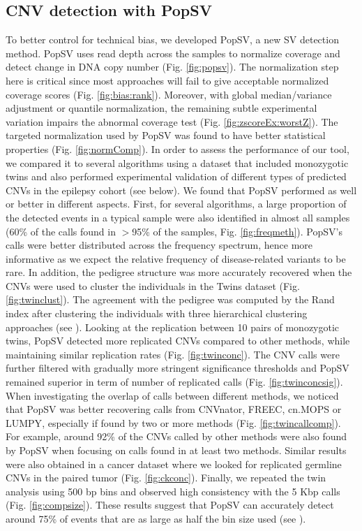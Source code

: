 \subsection*{CNV detection with {\sf PopSV}}
To better control for technical bias, we developed {\sf PopSV}, a new SV detection method.
{\sf PopSV} uses read depth across the samples to normalize coverage and detect change in DNA copy number (Fig. \ref{fig:popsv}).
The normalization step here is critical since most approaches will fail to give acceptable normalized coverage scores (Fig. \ref{fig:bias:rank}).
Moreover, with global median/variance adjustment or quantile normalization, the remaining subtle experimental variation impairs the abnormal coverage test (Fig. \ref{fig:zscoreEx:worstZ}).
The targeted normalization used by {\sf PopSV} was found to have better statistical properties (Fig. \ref{fig:normComp}).
In order to assess the performance of our tool, we compared it to several algorithms\cite{Boeva2011,Abyzov2011,Klambauer2012,Layer2012} using a dataset that included monozygotic twins and also performed experimental validation of different types of predicted CNVs in the epilepsy cohort (see below).
We found that {\sf PopSV} performed as well or better in different aspects.
First, for several algorithms, a large proportion of the detected events in a typical sample were also identified in almost all samples (60\% of the calls found in $>$95\% of the samples, Fig. \ref{fig:freqmeth}).
{\sf PopSV}'s calls were better distributed across the frequency spectrum, hence more informative as we expect the relative frequency of disease-related variants to be rare.
In addition, the pedigree structure was more accurately recovered when the CNVs were used to cluster the individuals in the Twins dataset (Fig. \ref{fig:twinclust}).
The agreement with the pedigree was computed by the Rand index after clustering the individuals with three hierarchical clustering approaches (see ).
Looking at the replication between 10 pairs of monozygotic twins, {\sf PopSV} detected more replicated CNVs compared to other methods, while maintaining similar replication rates (Fig. \ref{fig:twinconc}).
The CNV calls were further filtered with gradually more stringent significance thresholds and {\sf PopSV} remained superior in term of number of replicated calls (Fig. \ref{fig:twinconcsig}).
When investigating the overlap of calls between different methods, we noticed that {\sf PopSV} was better recovering calls from {\sf CNVnator}\cite{Abyzov2011}, {\sf FREEC}\cite{Boeva2011}, {\sf cn.MOPS}\cite{Klambauer2012} or {\sf LUMPY}\cite{Layer2012}, especially if found by two or more methods (Fig. \ref{fig:twincallcomp}).
For example, around 92\% of the CNVs called by other methods were also found by {\sf PopSV} when focusing on calls found in at least two methods.
Similar results were also obtained in a cancer dataset where we looked for replicated germline CNVs in the paired tumor (Fig. \ref{fig:ckconc}).
Finally, we repeated the twin analysis using 500 bp bins and observed high consistency with the 5 Kbp calls (Fig. \ref{fig:compsize}).
These results suggest that {\sf PopSV} can accurately detect around 75\% of events that are as large as half the bin size used (see ).

